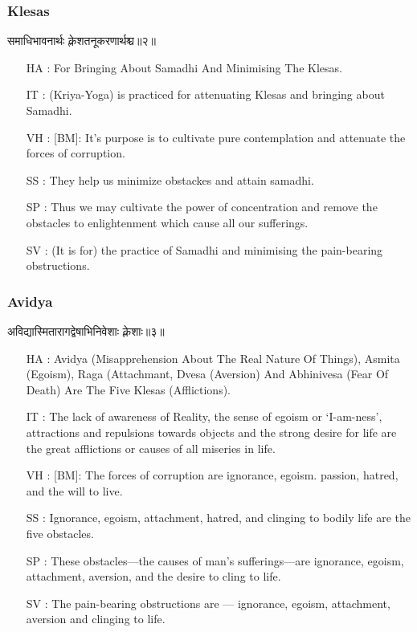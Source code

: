 \begin{frame}[fragile]\frametitle{Klesas}
\begin{sanskrit}
समाधिभावनार्थः क्लेशतनूकरणार्थश्च॥२॥
\end{sanskrit}

	\begin{itemize}
	\item [HA]: For Bringing About Samadhi And Minimising The Klesas.
	\item [IT]: (Kriya-Yoga) is practiced for attenuating Klesas and bringing about Samadhi.
	\item [VH]: [BM]: It’s purpose is to cultivate pure contemplation and attenuate the forces of corruption.
	\item [SS]: They help us minimize obstackes and attain samadhi.
	\item [SP]: Thus we may cultivate the power of concentration and remove the obstacles to enlightenment which cause all our sufferings.
	\item [SV]: (It is for) the practice of Samadhi and minimising the pain-bearing obstructions. 
	\end{itemize}
\end{frame}



\begin{frame}[fragile]\frametitle{Avidya}
\begin{sanskrit}
अविद्यास्मितारागद्वेषाभिनिवेशाः क्लेशाः॥३॥
\end{sanskrit}

	\begin{itemize}
	\item [HA]: Avidya (Misapprehension About The Real Nature Of Things), Asmita (Egoism), Raga (Attachmant, Dvesa (Aversion) And Abhinivesa (Fear Of Death) Are The Five Klesas (Afflictions).
	\item [IT]: The lack of awareness of Reality, the sense of egoism or ‘I-am-ness’, attractions and repulsions towards objects and the strong desire for life are the great afflictions or causes of all miseries in life.
	\item [VH]: [BM]: The forces of corruption are ignorance, egoism. passion, hatred, and the will to live.
	\item [SS]: Ignorance, egoism, attachment, hatred, and clinging to bodily life are the five obstacles.
	\item [SP]: These obstacles—the causes of man’s sufferings—are ignorance, egoism, attachment, aversion, and the desire to cling to life.
	\item [SV]: The pain-bearing obstructions are — ignorance, egoism, attachment, aversion and clinging to life. 
	\end{itemize}
\end{frame}

